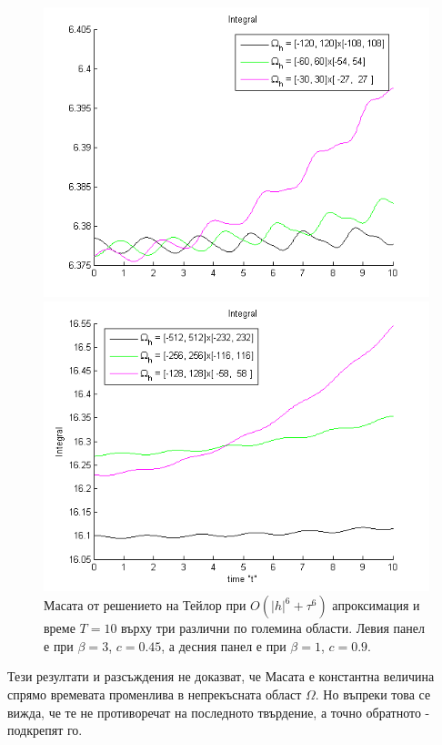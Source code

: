 \documentclass{article}
\begin{document}
\begin{figure}[ht]\vspace{0.2cm}
	\begin{minipage}[b]{0.4\linewidth}
		\includegraphics[width=\linewidth]{../amitans/figures/MassTaylor_120_60_30_ZB1_bt3_c045_h020_O(h^6).png}
	\end{minipage}	
	\begin{minipage}[b]{0.4\linewidth}
		\includegraphics[width=\linewidth]{../amitans/figures/MassTaylor_512_256_128_ZB1_bt1_c090_h040_O(h^6).png}
		
	\end{minipage}
\caption{Масата от решението на Тейлор при $O(|h|^6 + \tau^6)$ апроксимация и време $T=10$ върху три различни по големина области. Левия панел е при $\beta =  3$, $c = 0.45$, а десния панел е при $\beta =  1$, $c = 0.9$.}
\label{Test1_2Mass}
\end{figure}
Тези резултати и разсъждения не доказват, че Масата е константна величина спрямо времевата променлива в непрекъсната област $\Omega$. Но въпреки това се вижда, че те не противоречат на последното твърдение, а точно обратното - подкрепят го. 
\end{document}
